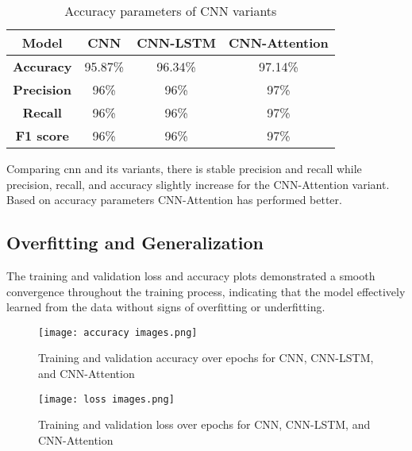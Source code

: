\begin{table}[h]
    \caption{Accuracy parameters of CNN variants}
    \centering
    \begin{tabular}{|c|c|c|c|}
    \hline
      \textbf{Model} & \textbf{CNN} & \textbf{CNN-LSTM} & \textbf{CNN-Attention} \\
      \hline
        \textbf{Accuracy} &95.87\%  &96.34\% & 97.14\%\\
        \hline
        \textbf{Precision} & 96\%& 96\%&97\% \\
        \hline
        \textbf{Recall} & 96\%&96\% &97\% \\
       \hline
       \textbf{F1 score} & 96\%&96\% &97\% \\
       \hline
    \end{tabular} 
   
    \label{tab:accuracy_params_of_cnn_variants}
\end{table}

Comparing \ac{cnn} and its variants, there is stable precision and recall while precision, recall, and accuracy slightly increase for the CNN-Attention variant. Based on accuracy parameters CNN-Attention has performed better.
\clearpage

\subsection{Overfitting and Generalization} 
The training and validation loss and accuracy plots demonstrated a smooth convergence throughout the training process, indicating that the model effectively learned from the data without signs of overfitting or underfitting.

\begin{figure}[h]
    \centering
    \texttt{[image: accuracy images.png]}
    \caption{Training and validation accuracy over epochs for CNN, CNN-LSTM, and CNN-Attention}  
\end{figure}

\begin{figure}[h]
    \centering
    \texttt{[image: loss images.png]}
    \caption{Training and validation loss over epochs for CNN, CNN-LSTM, and CNN-Attention}   
\end{figure}
\clearpage
